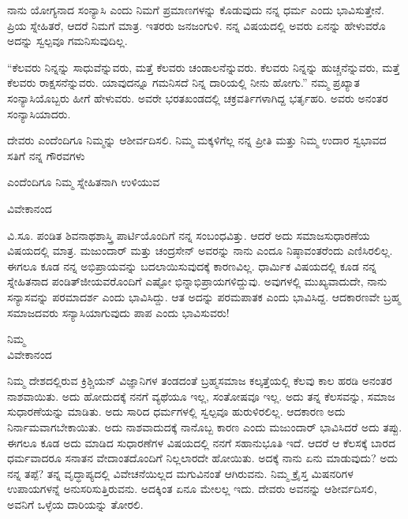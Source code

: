 ನಾನು ಯೋಗ್ಯನಾದ ಸಂನ್ಯಾಸಿ ಎಂದು ನಿಮಗೆ ಪ್ರಮಾಣಗಳನ್ನು ಕೊಡುವುದು ನನ್ನ ಧರ್ಮ ಎಂದು ಭಾವಿಸುತ್ತೇನೆ. ಪ್ರಿಯ ಸ್ನೇಹಿತರೆ, ಆದರೆ ನಿಮಗೆ ಮಾತ್ರ. ಇತರರು ಜನಜಂಗುಳಿ. ನನ್ನ ವಿಷಯದಲ್ಲಿ ಅವರು ಏನನ್ನು ಹೇಳುವರೊ ಅದನ್ನು ಸ್ವಲ್ಪವೂ ಗಮನಿಸುವುದಿಲ್ಲ.

“ಕೆಲವರು ನಿನ್ನನ್ನು ಸಾಧುವೆನ್ನುವರು, ಮತ್ತೆ ಕೆಲವರು ಚಂಡಾಲನೆನ್ನುವರು. ಕೆಲವರು ನಿನ್ನನ್ನು ಹುಚ್ಚನೆನ್ನುವರು, ಮತ್ತೆ ಕೆಲವರು ರಾಕ್ಷಸನೆನ್ನುವರು. ಯಾವುದನ್ನೂ ಗಮನಿಸದೆ ನಿನ್ನ ದಾರಿಯಲ್ಲಿ ನೀನು ಹೋಗು.'' ನಮ್ಮ ಪ್ರಖ್ಯಾತ ಸಂನ್ಯಾಸಿಯೊಬ್ಬರು ಹೀಗೆ ಹೇಳುವರು. ಅವರೇ ಭರತಖಂಡದಲ್ಲಿ ಚಕ್ರವರ್ತಿಗಳಾಗಿದ್ದ ಭರ್ತೃಹರಿ. ಅವರು ಅನಂತರ ಸಂನ್ಯಾಸಿಯಾದರು.

ದೇವರು ಎಂದೆಂದಿಗೂ ನಿಮ್ಮನ್ನು ಆಶೀರ್ವದಿಸಲಿ. ನಿಮ್ಮ ಮಕ್ಕಳಿಗೆಲ್ಲ ನನ್ನ ಪ್ರೀತಿ ಮತ್ತು ನಿಮ್ಮ ಉದಾರ ಸ್ವಭಾವದ ಸತಿಗೆ ನನ್ನ ಗೌರವಗಳು

ಎಂದೆಂದಿಗೂ ನಿಮ್ಮ ಸ್ನೇಹಿತನಾಗಿ ಉಳಿಯುವ

\begin{flushright}
ವಿವೇಕಾನಂದ
\end{flushright}

ವಿ.ಸೂ. \enginline{-}ಪಂಡಿತ ಶಿವನಾಥಶಾಸ್ತ್ರಿ ಪಾರ್ಟಿಯೊಂದಿಗೆ ನನ್ನ ಸಂಬಂಧವಿತ್ತು. ಆದರೆ ಅದು ಸಮಾಜಸುಧಾರಣೆಯ ವಿಷಯದಲ್ಲಿ ಮಾತ್ರ. ಮಜುಂದಾರ್‌ ಮತ್ತು ಚಂದ್ರಸೇನ್ ಅವರನ್ನು ನಾನು ಎಂದೂ ನಿಷ್ಠಾವಂತರೆಂದು ಎಣಿಸಿರಲಿಲ್ಲ. ಈಗಲೂ ಕೂಡ ನನ್ನ ಅಭಿಪ್ರಾಯವನ್ನು ಬದಲಾಯಿಸುವುದಕ್ಕೆ ಕಾರಣವಿಲ್ಲ. ಧಾರ್ಮಿಕ ವಿಷಯದಲ್ಲಿ ಕೂಡ ನನ್ನ ಸ್ನೇಹಿತನಾದ ಪಂಡಿತ್‌ಜೀಯವರೊಂದಿಗೆ ಎಷ್ಟೋ ಭಿನ್ನಾಭಿಪ್ರಾಯಗಳಿದ್ದುವು. ಅವುಗಳಲ್ಲಿ ಮುಖ್ಯವಾದುದೇ, ನಾನು ಸನ್ಯಾಸವನ್ನು ಪರಮಾದರ್ಶ ಎಂದು ಭಾವಿಸಿದ್ದು. ಆತ ಅದನ್ನು ಪರಮಪಾತಕ ಎಂದು ಭಾವಿಸಿದ್ದ. ಆದಕಾರಣವೇ ಬ್ರಹ್ಮ ಸಮಾಜದವರು ಸನ್ಯಾಸಿಯಾಗುವುದು ಪಾಪ ಎಂದು ಭಾವಿಸುವರು!

\vspace{-0.3cm}

{\flushright
ನಿಮ್ಮ\\ವಿವೇಕಾನಂದ\par}

\vspace{0.2cm}

ನಿಮ್ಮ ದೇಶದಲ್ಲಿರುವ ಕ್ರಿಶ್ಚಿಯನ್ ವಿಜ್ಞಾನಿಗಳ ತಂಡದಂತೆ ಬ್ರಹ್ಮಸಮಾಜ ಕಲ್ಕತ್ತೆಯಲ್ಲಿ ಕೆಲವು ಕಾಲ ಹರಡಿ ಅನಂತರ ನಾಶವಾಯಿತು. ಅದು ಹೋದುದಕ್ಕೆ ನನಗೆ ವ್ಯಥೆಯೂ ಇಲ್ಲ, ಸಂತೋಷವೂ ಇಲ್ಲ. ಅದು ತನ್ನ ಕೆಲಸವನ್ನು, ಸಮಾಜ ಸುಧಾರಣೆಯನ್ನು ಮಾಡಿತು. ಅದು ಸಾರಿದ ಧರ್ಮಗಳಲ್ಲಿ ಸ್ವಲ್ಪವೂ ಹುರುಳಿರಲಿಲ್ಲ. ಆದಕಾರಣ ಅದು ನಿರ್ನಾಮವಾಗಬೇಕಾಯಿತು. ಅದು ನಾಶವಾದುದಕ್ಕೆ ನಾನೊಬ್ಬ ಕಾರಣ ಎಂದು ಮಜುಂದಾರ್ ಭಾವಿಸಿದರೆ ಅದು ತಪ್ಪು. ಈಗಲೂ ಕೂಡ ಅದು ಮಾಡಿದ ಸುಧಾರಣೆಗಳ ವಿಷಯದಲ್ಲಿ ನನಗೆ ಸಹಾನುಭೂತಿ ಇದೆ. ಆದರೆ ಆ ಕೆಲಸಕ್ಕೆ ಬಾರದ ಧರ್ಮವಾದರೂ ಸನಾತನ ವೇದಾಂತದೊಂದಿಗೆ ನಿಲ್ಲಲಾರದೇ ಹೋಯಿತು. ಅದಕ್ಕೆ ನಾನು ಏನು ಮಾಡುವುದು? ಅದು ನನ್ನ ತಪ್ಪೆ? ತನ್ನ ವೃದ್ಧಾಪ್ಯದಲ್ಲಿ ವಿವೇಚನೆಯಿಲ್ಲದ ಮಗುವಿನಂತೆ ಆಗಿರುವನು. ನಿಮ್ಮ ಕ್ರೈಸ್ತ ಮಿಷನರಿಗಳ ಉಪಾಯಗಳನ್ನೆ ಅನುಸರಿಸುತ್ತಿರುವನು. ಅದಕ್ಕಿಂತ ಏನೂ ಮೇಲಲ್ಲ ಇದು. ದೇವರು ಅವನನ್ನು ಆಶೀರ್ವದಿಸಲಿ, ಅವನಿಗೆ ಒಳ್ಳೆಯ ದಾರಿಯನ್ನು ತೋರಲಿ.

\vspace{-0.3cm}

